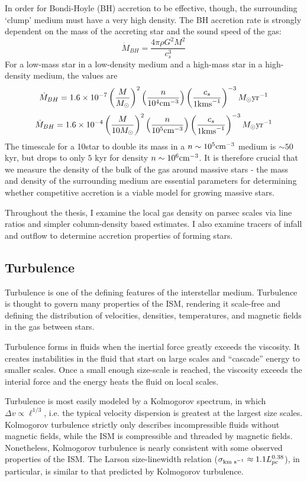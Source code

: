 In order for Bondi-Hoyle (BH) accretion to be effective, though, the surrounding `clump'
medium must have a very high density.  The BH accretion rate is strongly dependent on the 
mass of the accreting star and the sound speed of the gas:
$$\dot{M}_{BH} = \frac{4 \pi \rho G^2 M^2}{c_s^3} $$
For a low-mass star in a low-density medium and a high-mass star in a high-density medium,
the values are
$$\dot{M}_{BH} = 1.6\times10^{-7} \left(\frac{M}{M_\odot}\right)^2 \left(\frac{n}{10^4 \mathrm{cm}^{-3}}\right) \left(\frac{c_s}{1 \mathrm{km s}^{-1}}\right)^{-3} M_{\odot} \textrm{yr}^{-1}$$
$$\dot{M}_{BH} = 1.6\times10^{-4} \left(\frac{M}{10 M_\odot}\right)^2 \left(\frac{n}{10^5 \mathrm{cm}^{-3}}\right) \left(\frac{c_s}{1 \mathrm{km s}^{-1}}\right)^{-3} M_{\odot} \textrm{yr}^{-1}$$
The timescale for a 10\msun star to double its mass in a $n\sim10^5\textrm{cm}^{-3}$
medium is $\sim50$ kyr, but drops to only $5$ kyr for density
$n\sim10^6\textrm{cm}^{-3}$.  
It is therefore crucial that we measure the density of the bulk of the gas
around massive stars - the mass and density of the surrounding medium are
essential parameters for determining whether competitive accretion is a viable
model for growing massive stars.

Throughout the thesis, I examine the local gas density on parsec scales via
line ratios and simpler column-density based estimates.  I also examine tracers
of infall and outflow to determine accretion properties of forming stars.

\subsection{Turbulence}
Turbulence is one of the defining features of the interstellar medium.
Turbulence is thought to govern many properties of the ISM, rendering it
scale-free and defining the distribution of velocities, densities,
temperatures, and magnetic fields in the gas between stars.

Turbulence forms in fluids when the inertial force greatly exceeds the
viscosity.  It creates instabilities in the fluid that start on large scales
and ``cascade'' energy to smaller scales.  Once a small enough size-scale is
reached, the viscosity exceeds the interial force and the energy heats the
fluid on local scales.

Turbulence is most easily modeled by a Kolmogorov spectrum, in which $\Delta v
\propto \ell^{1/3}$, i.e. the typical velocity dispersion is greatest at the
largest size scales.  Kolmogorov turbulence strictly only describes
incompressible fluids without magnetic fields, while the ISM is compressible
and threaded by magnetic fields.  Nonetheless, Kolmogorov turbulence is nearly
consistent with some observed properties of the ISM.  The Larson size-linewidth
relation ($\sigma_{\textrm{km~s}^{-1}}\approx1.1 L_{pc}^{0.38}$), in particular, is similar
to that predicted by Kolmogorov turbulence.

